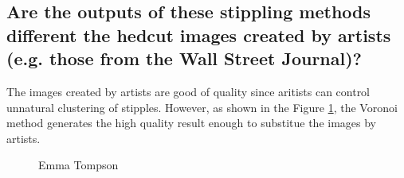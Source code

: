 \documentclass[11pt]{article}
\begin{document}
\subsection{Are the outputs of these stippling methods different the hedcut images created by artists (e.g. those from the Wall Street Journal)?}
The images created by artists are good of quality since aritists can control unnatural clustering of stipples. However, as shown in the Figure \ref{fig:emmatompson}, the Voronoi method generates the high quality result enough to substitue the images by artists.
\begin{figure}[ht] 
	\begin{center} 
	\hspace{3mm}
	\hspace{3mm}
	\hspace{3mm}
	\caption{Emma Tompson} 
	\label{fig:emmatompson}
	\end{center} 
\end{figure}
\end{document}
